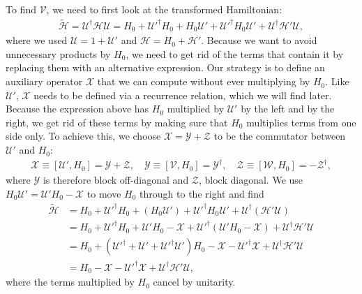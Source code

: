 To find $\mathcal{V}$, we need to first look at the transformed Hamiltonian:
%
\begin{align}
\tilde{\mathcal{H}} = \mathcal{U}^\dagger \mathcal{H} \mathcal{U} = H_0 +
\mathcal{U}'^\dagger H_0 + H_0 \mathcal{U}' + \mathcal{U}'^\dagger H_0
\mathcal{U}' + \mathcal{U}^\dagger\mathcal{H'}\mathcal{U},
\end{align}
%
where we used $\mathcal{U}=1+\mathcal{U}'$ and $\mathcal{H} = H_0 +
\mathcal{H'}$.
Because we want to avoid unnecessary products by $H_0$, we need to get rid of
the terms that contain it by replacing them with an alternative expression.
Our strategy is to define an auxiliary operator $\mathcal{X}$ that we can
compute without ever multiplying by $H_0$.
Like $\mathcal{U}'$, $\mathcal{X}$ needs to be defined via a recurrence
relation, which we will find later.
Because the expression above has $H_0$ multiplied by $\mathcal{U}'$ by the left
and by the right, we get rid of these terms by making sure that $H_0$
multiplies terms from one side only.
To achieve this, we choose $\mathcal{X}=\mathcal{Y}+\mathcal{Z}$ to be the commutator between
$\mathcal{U}'$ and $H_0$:
%
\begin{align}
\label{eq:XYZ}
\mathcal{X} \equiv [\mathcal{U}', H_0] = \mathcal{Y} + \mathcal{Z}, \quad
\mathcal{Y} \equiv [\mathcal{V}, H_0] = \mathcal{Y}^\dagger,\quad
\mathcal{Z} \equiv [\mathcal{W}, H_0] = -\mathcal{Z}^\dagger,
\end{align}
%
where $\mathcal{Y}$ is therefore block off-diagonal and $\mathcal{Z}$, block
diagonal.
We use $H_0 \mathcal{U}' = \mathcal{U}' H_0 -\mathcal{X}$ to move $H_0$ through
to the right and find
%
\begin{align}
\label{eq:H_tilde}
  \tilde{\mathcal{H}}
  &= H_0 + \mathcal{U}'^\dagger H_0 + (H_0 \mathcal{U}') + \mathcal{U}'^\dagger H_0
  \mathcal{U}' + \mathcal{U}^\dagger(\mathcal{H'}\mathcal{U}) \nonumber
  \\
  &= H_0 + \mathcal{U}'^\dagger H_0 + \mathcal{U}'H_0 - \mathcal{X} + \mathcal{U}'^\dagger (\mathcal{U}' H_0 - \mathcal{X}) + \mathcal{U}^\dagger\mathcal{H'}\mathcal{U} \nonumber \\
  &= H_0 + (\mathcal{U}'^\dagger + \mathcal{U}' + \mathcal{U}'^\dagger \mathcal{U}')H_0 - \mathcal{X} - \mathcal{U}'^\dagger \mathcal{X} + \mathcal{U}^\dagger\mathcal{H'}\mathcal{U} \nonumber \\
  &= H_0 - \mathcal{X} - \mathcal{U}'^\dagger \mathcal{X} + \mathcal{U}^\dagger\mathcal{H'}\mathcal{U},
\end{align}
%
where the terms multiplied by $H_0$ cancel by unitarity.

